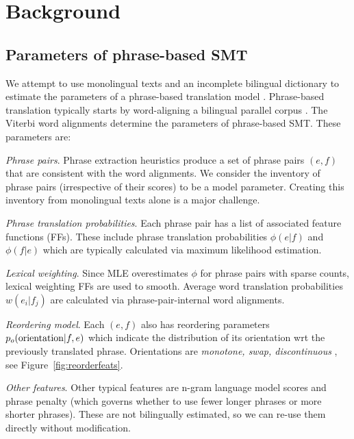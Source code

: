 \documentclass[11pt]{article}
\newcommand{\figref}[1]{Figure~\ref{#1}}
\newenvironment{my_itemize}{
\begin{itemize}
  \setlength{\itemsep}{2pt}
  \setlength{\parskip}{2pt}
  \setlength{\parsep}{1pt}}{\end{itemize}
}
\begin{document}

\section{Background} \label{sect:bckg}
\subsection{Parameters of phrase-based SMT} \label{sect:bckg:smt}

We attempt to use monolingual texts and an incomplete bilingual dictionary to estimate the parameters of a phrase-based translation  model \cite{Koehn:2003,Moses}.  Phrase-based translation typically starts by word-aligning a bilingual parallel corpus \cite{Och2003}.  The Viterbi word alignments determine the parameters of phrase-based SMT.  These parameters are:

\begin{my_itemize}
\item \emph{Phrase pairs}.  
Phrase extraction heuristics \cite{Venugopal2003,Tillmann2003,Och2004} produce a set of phrase pairs $(e, f)$ that are consistent with the word alignments.  We consider the inventory of phrase pairs (irrespective of their scores) to be a model parameter.  
Creating this inventory from monolingual texts alone is a major challenge.

\item \emph{Phrase translation probabilities}.  Each phrase pair has a list of associated feature functions (FFs).  These include phrase translation probabilities ${\phi(e|f)}$ and ${\phi(f|e)}$ which are  typically calculated via maximum likelihood estimation. 

\item \emph{Lexical weighting}.  Since MLE overestimates ${\phi}$ for phrase pairs with sparse counts, lexical weighting FFs are used to smooth.  Average word translation probabilities ${w(e_i|f_j)}$ are calculated via phrase-pair-internal word alignments.

\item \emph{Reordering model}.  Each $(e, f)$ also has reordering parameters $p_o(\textnormal{orientation}|f,e)$ which indicate the distribution of its orientation wrt the previously translated phrase. Orientations are {\it monotone, swap, discontinuous} \cite{tillman:2004:HLTNAACL,Kumar2004}, see \figref{fig:reorderfeats}. 

\item \emph{Other features}. Other typical features are n-gram language model scores and phrase penalty (which governs whether to use fewer longer phrases or more shorter phrases).  These are not bilingually estimated, so we can re-use them directly without modification. 
\end{my_itemize}
\end{document}
